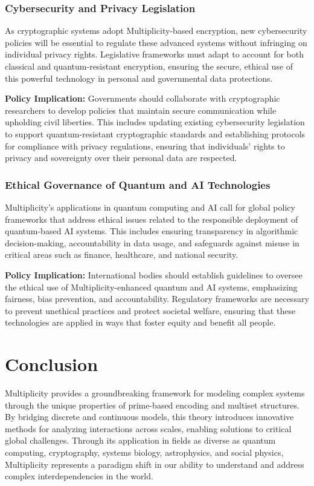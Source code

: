 \documentclass{article}
\theoremstyle{plain}
\begin{document}
\begin{enumerate}
\subsubsection{Cybersecurity and Privacy Legislation}

As cryptographic systems adopt Multiplicity-based encryption, new cybersecurity policies will be essential to regulate these advanced systems without infringing on individual privacy rights. Legislative frameworks must adapt to account for both classical and quantum-resistant encryption, ensuring the secure, ethical use of this powerful technology in personal and governmental data protections.

\textbf{Policy Implication:} Governments should collaborate with cryptographic researchers to develop policies that maintain secure communication while upholding civil liberties. This includes updating existing cybersecurity legislation to support quantum-resistant cryptographic standards and establishing protocols for compliance with privacy regulations, ensuring that individuals’ rights to privacy and sovereignty over their personal data are respected.

\subsubsection{Ethical Governance of Quantum and AI Technologies}

Multiplicity’s applications in quantum computing and AI call for global policy frameworks that address ethical issues related to the responsible deployment of quantum-based AI systems. This includes ensuring transparency in algorithmic decision-making, accountability in data usage, and safeguards against misuse in critical areas such as finance, healthcare, and national security.

\textbf{Policy Implication:} International bodies should establish guidelines to oversee the ethical use of Multiplicity-enhanced quantum and AI systems, emphasizing fairness, bias prevention, and accountability. Regulatory frameworks are necessary to prevent unethical practices and protect societal welfare, ensuring that these technologies are applied in ways that foster equity and benefit all people.

\section{Conclusion}

Multiplicity provides a groundbreaking framework for modeling complex systems through the unique properties of prime-based encoding and multiset structures. By bridging discrete and continuous models, this theory introduces innovative methods for analyzing interactions across scales, enabling solutions to critical global challenges. Through its application in fields as diverse as quantum computing, cryptography, systems biology, astrophysics, and social physics, Multiplicity represents a paradigm shift in our ability to understand and address complex interdependencies in the world.


\end{enumerate}
\end{document}
